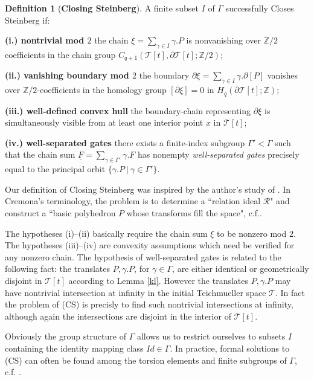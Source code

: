 \documentclass[12pt]{amsart}
\theoremstyle{definition}
\newtheorem{dfn}[thm]{Definition}
\theoremstyle{remark}
\newcommand{\bZ}{\mathbb{Z}}
\newcommand{\del}{\partial}
\newcommand{\uF}{\underline{F}}
\newcommand{\sT}{\mathscr{T}}
\begin{document}
\begin{dfn}[\textbf{Closing Steinberg}]\label{cs}
A finite subset $I$ of $\Gamma$ successfully Closes Steinberg if: 

\textbf{(i.) nontrivial mod $2$} the chain $\xi=\sum_{\gamma\in I} \gamma.P $ is nonvanishing over $\bZ/2$ coefficients in the chain group $C_{q+1}(\sT[t],\del \sT[t];\bZ/2)$;  

\textbf{(ii.) vanishing boundary mod $2$} the boundary $\del \xi=\sum_{\gamma\in I} \gamma.\del [P] $
vanishes over $\bZ/2$-coefficients in the homology group $[\del \xi]=0$ in $H_q(\del \sT[t]; \bZ)$;

\textbf{(iii.) well-defined convex hull} the boundary-chain representing $\del \xi$ is simultaneously visible from at least one interior point $x$ in $\sT[t]$;

\textbf{(iv.) well-separated gates} there exists a finite-index subgroup $\Gamma' < \Gamma$ such that the chain sum $\uF=\sum_{\gamma \in \Gamma'}\gamma.F$ has nonempty \emph{well-separated gates} precisely equal to the principal orbit $\{\gamma.P ~|~ \gamma\in \Gamma'\}$. 
\end{dfn}

Our definition of Closing Steinberg was inspired by the author's study of \cite{Cremona}. In Cremona's terminology, the problem is to determine a ``relation ideal $\mathscr{R}$" and construct a ``basic polyhedron $P$ whose transforms fill the space", c.f.\cite[pp.290]{Cremona}. 


The hypotheses (i)--(ii) basically require the chain sum $\xi$ to be nonzero mod $2$. The hypotheses (iii)--(iv) are convexity assumptions which need be verified for any nonzero chain. The hypothesis of well-separated gates is related to the following fact: the translates $P, \gamma.P$, for $\gamma\in \Gamma$, are either identical or geometrically disjoint in $\sT[t]$ according to Lemma \ref{kl}. However the translates $P, \gamma.P$ may have nontrivial intersection at infinity in the initial Teichmueller space $\sT$. In fact the problem of (CS) is precisly to find such nontrivial intersections at infinity, although again the intersections are disjoint in the interior of $\sT[t]$.

Obviously the group structure of $\Gamma$ allows us to restrict ourselves to subsets $I$ containing the identity mapping class $Id\in \Gamma$. In practice, formal solutions to (CS) can often be found among the torsion elements and finite subgroups of $\Gamma$, c.f. \cite{Cremona}.
\end{document}
